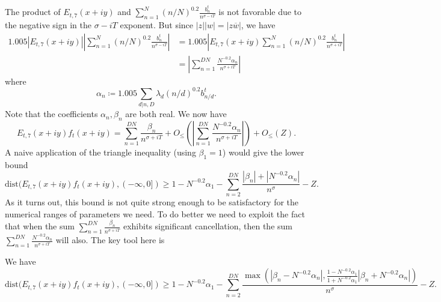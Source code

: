 The product of $E_{t,7}(x+iy)$ and $\sum_{n=1}^N (n/N)^{0.2} \frac{b_n^t}{n^{\sigma-iT}}$ is not favorable due to the negative sign in the $\sigma-iT$ exponent.  But since $|z| |w| = |z \overline{w}|$, we have
\begin{align*}
1.005 |E_{t,7}(x+iy)| |\sum_{n=1}^N (n/N)^{0.2} \frac{b_n^t}{n^{\sigma-iT}}|  &=
1.005 |E_{t,7}(x+iy) \sum_{n=1}^N (n/N)^{0.2} \frac{b_n^t}{n^{\sigma+iT}}|  \\
&= |\sum_{n=1}^{DN} \frac{N^{-0.2} \alpha_{n}}{n^{\sigma+iT}}|
\end{align*}
where
$$ \alpha_{n} \coloneqq 1.005 \sum_{d|n,D} \lambda_d (n/d)^{0.2} b_{n/d}^t.$$
Note that the coefficients $\alpha_{n}, \beta_n$ are both real.  We now have
\begin{equation}\label{ets}
 E_{t,7}(x+iy) f_t(x+iy) = \sum_{n=1}^{DN} \frac{\beta_n}{n^{\sigma+iT}} + O_{\leq}( |\sum_{n=1}^{DN} \frac{N^{-0.2} \alpha_{n}}{n^{\sigma+iT}}| ) + O_{\leq}(Z).
\end{equation}
A naive application of the triangle inequality (using $\beta_1=1$) would give the lower bound
$$ \mathrm{dist}(E_{t,7}(x+iy) f_t(x+iy), (-\infty,0]) \geq 1 - N^{-0.2} \alpha_{1} - \sum_{n=2}^{DN} \frac{|\beta_n| + |N^{-0.2} \alpha_{n}|}{n^{\sigma}} - Z.$$
As it turns out, this bound is not quite strong enough to be satisfactory for the numerical ranges of parameters we need.  To do better we need to exploit the fact that when the sum $\sum_{n=1}^{DN} \frac{\beta_n}{n^{\sigma+iT}}$ exhibits significant cancellation, then the sum $\sum_{n=1}^{DN} \frac{N^{-0.2} \alpha_{n}}{n^{\sigma+iT}}$ will also. The key tool here is

\begin{lemma}  We have
$$ \mathrm{dist}(E_{t,7}(x+iy) f_t(x+iy), (-\infty,0]) \geq 1 - N^{-0.2} \alpha_{1} - \sum_{n=2}^{DN} \frac{\max(|\beta_n-N^{-0.2} \alpha_{n}|, \frac{1-N^{-0.2} \alpha_{1}}{1+N^{-0.2} \alpha_{1}} |\beta_n+N^{-0.2} \alpha_{n}|)}{n^{\sigma}} - Z.$$
\end{lemma}

